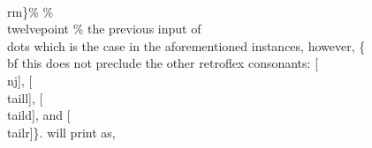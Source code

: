   \\rm\}\%
\%
\\twelvepoint
\%
\aie
\nin the previous input of
\aib\lin{0pt}
\\dots which is the case in the aforementioned
instances, however, \{\\bf this
does not preclude the other retroflex consonants:
[\\nj], [\\taill], [\\taild], and [\\tailr]\}.
\aie
\nin will print as,
 
\vs{5pt}
\np
\parindent 0pt
\twelvept
\def\oct#1{\hbox{\rm\'{}\kern-.1em\it#1\/\kern.05em}}
\def\hex#1{\hbox{\rm\H{}\tt#1}} %
 
